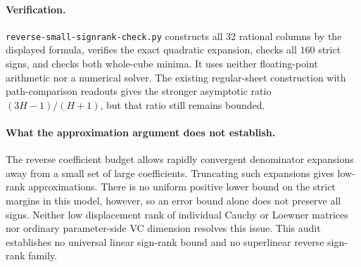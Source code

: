 \documentclass[11pt]{article}
\begin{document}
\paragraph{Verification.}
\texttt{reverse-small-signrank-check.py} constructs all $32$ rational
columns by the displayed formula, verifies the exact quadratic expansion,
checks all $160$ strict signs, and checks both whole-cube minima. It uses
neither floating-point arithmetic nor a numerical solver. The existing
regular-sheet construction with path-comparison readouts gives the stronger
asymptotic ratio $(3H-1)/(H+1)$, but that ratio still remains bounded.

\paragraph{What the approximation argument does not establish.}
The reverse coefficient budget allows rapidly convergent denominator
expansions away from a small set of large coefficients. Truncating such
expansions gives low-rank approximations. There is no uniform positive
lower bound on the strict margins in this model, however, so an error
bound alone does not preserve all signs. Neither low displacement rank
of individual Cauchy or Loewner matrices nor ordinary parameter-side VC
dimension resolves this issue. This audit establishes no universal
linear sign-rank bound and no superlinear reverse sign-rank family.
\end{document}
